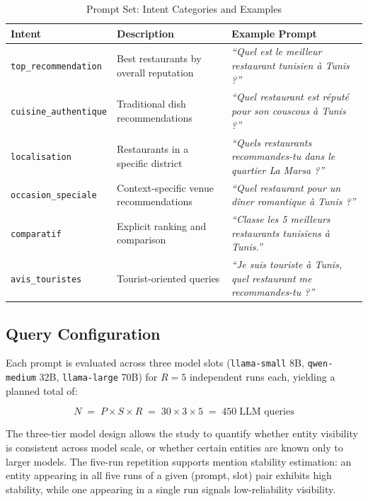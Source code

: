 \begin{table}[H]
\centering
\caption{Prompt Set: Intent Categories and Examples}
\label{tab:prompts}
\begin{tabular}{|p{4cm}|p{4.7cm}|p{5.2cm}|}
\hline
\textbf{Intent} & \textbf{Description} & \textbf{Example Prompt} \\
\hline
\texttt{top\_recommendation} & Best restaurants by overall reputation & \textit{``Quel est le meilleur restaurant tunisien à Tunis ?''} \\
\hline
\texttt{cuisine\_authentique} & Traditional dish recommendations & \textit{``Quel restaurant est réputé pour son couscous à Tunis ?''} \\
\hline
\texttt{localisation} & Restaurants in a specific district & \textit{``Quels restaurants recommandes-tu dans le quartier La Marsa ?''} \\
\hline
\texttt{occasion\_speciale} & Context-specific venue recommendations & \textit{``Quel restaurant pour un dîner romantique à Tunis ?''} \\
\hline
\texttt{comparatif} & Explicit ranking and comparison & \textit{``Classe les 5 meilleurs restaurants tunisiens à Tunis.''} \\
\hline
\texttt{avis\_touristes} & Tourist-oriented queries & \textit{``Je suis touriste à Tunis, quel restaurant me recommandes-tu ?''} \\
\hline
\end{tabular}
\end{table}

\subsection{Query Configuration}

Each prompt is evaluated across three model slots
(\texttt{llama-small} 8B, \texttt{qwen-medium} 32B, \texttt{llama-large} 70B)
for $R = 5$ independent runs each, yielding a planned total of:

\[
N \;=\; P \times S \times R \;=\; 30 \times 3 \times 5 \;=\; 450 \;\text{LLM queries}
\]

The three-tier model design allows the study to quantify whether entity visibility
is consistent across model scale, or whether certain entities are known only to
larger models. The five-run repetition supports mention stability estimation:
an entity appearing in all five runs of a given (prompt, slot) pair exhibits high
stability, while one appearing in a single run signals low-reliability visibility.

